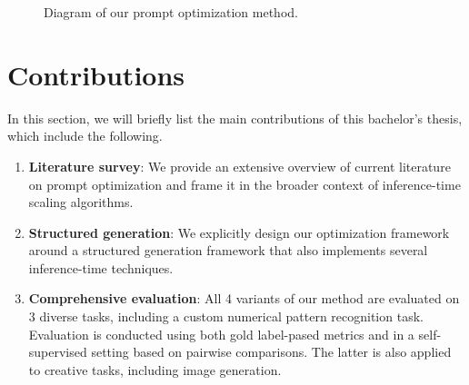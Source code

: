 \begin{figure}[ht]
    \caption{Diagram of our prompt optimization method.}
    \label{fig:methoddiagram}
\end{figure}

\newpage
\section{Contributions}
In this section, we will briefly list the main contributions of this bachelor's thesis, which include the following. 
\begin{enumerate}
    \item \textbf{Literature survey}: We provide an extensive overview of current literature on prompt optimization and frame it in the broader context of inference-time scaling algorithms.
    \item \textbf{Structured generation}: We explicitly design our optimization framework around a structured generation framework that also implements several inference-time techniques.
    \item \textbf{Comprehensive evaluation}: All 4 variants of our method are evaluated on 3 diverse tasks, including a custom numerical pattern recognition task. Evaluation is conducted using both gold label-pased metrics and in a self-supervised setting based on pairwise comparisons. The latter is also applied to creative tasks, including image generation.
\end{enumerate}
